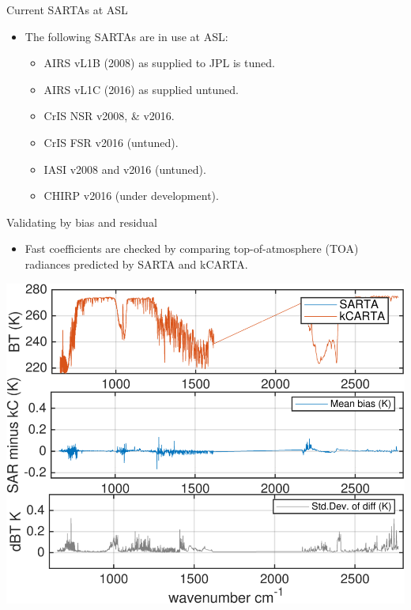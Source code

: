 \documentclass[10pt,t]{beamer}
\begin{document}
\begin{frame}{Current SARTAs at ASL}

  \begin{itemize}
  \item The following SARTAs are in use at ASL:
    \begin{itemize}
    \item AIRS vL1B (2008) as supplied to JPL is tuned.
    \item AIRS vL1C (2016) as supplied untuned.
    \item CrIS NSR v2008, \& v2016.
    \item CrIS FSR v2016 (untuned).
    \item IASI v2008 and v2016 (untuned).
    \item CHIRP v2016 (under development).
    \end{itemize}
  \end{itemize}
  

\end{frame}
\begin{frame}{Validating by bias and residual}

  \begin{itemize}
  \item Fast coefficients are checked by comparing top-of-atmosphere (TOA) radiances predicted by SARTA and kCARTA.
  \end{itemize}
      \begin{center}
    \includegraphics[width=0.6\linewidth]{./Figs/kc_sar_airs_l1c_mean_bias_stdv_sea_6angs_aslp.png}
  \end{center}
  

\end{frame}
\end{document}
